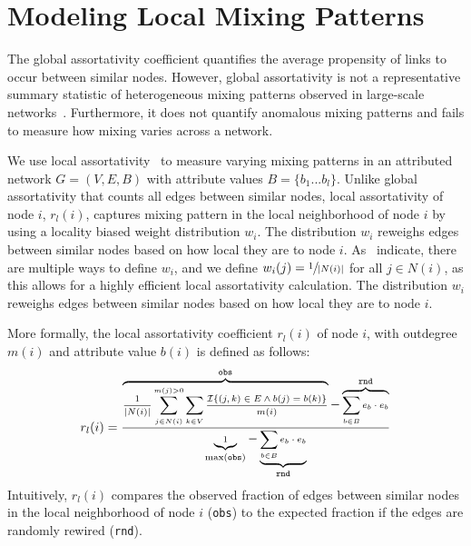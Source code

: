 \section{Modeling Local Mixing Patterns}
\label{subsec:LocalMixing}

The global assortativity coefficient quantifies
the average propensity of links to occur between similar nodes.
However, global assortativity is not a representative summary statistic of
heterogeneous mixing patterns observed in large-scale networks~\cite{peel2018multiscale}.
Furthermore, it does not quantify anomalous mixing patterns and fails to measure how mixing varies across a network.

We use local assortativity~\cite{peel2018multiscale} to measure varying
mixing patterns in an attributed network $G=(V,E,B)$ with attribute values $B=\{b_1...b_l\}$.
Unlike global assortativity that counts all edges between similar nodes, local assortativity
of node $i$, $r_l(i)$, captures mixing pattern in the local neighborhood of node
$i$ by using a locality biased weight distribution $w_i$. The distribution
$w_i$ reweighs edges between similar nodes based on how local they are to
node $i$. As~\citet{peel2018multiscale} indicate, there are multiple ways
to define $w_i$, and we define $w_i(j) = \sfrac{1}{|N(i)|}$ for all $j \in N(i)$, as this allows for a highly efficient local assortativity calculation.
The distribution $w_i$ reweighs edges between similar nodes
based on how local they are to node $i$.

More formally, the local assortativity coefficient $r_l(i)$ of node $i$, with outdegree $m(i)$ and
attribute value $b(i)$ is defined as follows:
\vspace{-1mm}
\begin{align*}
	\scriptsize r_l(i) = \frac{\overbrace{\frac{1}{|N(i)|}\sum\limits_{j \in N(i)}^{m(j) > 0} \sum_{k \in V} \frac{\mathcal{I}\{(j,k) \in E \wedge b(j)=b(k)\}}{m(i)} }^{\texttt{obs}}-\overbrace{\sum_{b \in B} e_{b}\cdot e_{b}}^{\texttt{rnd}}}{\underbrace{1}_{\max(\texttt{obs})}-\underbrace{\sum_{b \in B} e_{b} \cdot e_{b}}_\texttt{rnd}}
\end{align*}
Intuitively, $r_l(i)$ compares the observed fraction of edges between similar nodes
in the local neighborhood of node $i$ (\texttt{obs}) to the expected fraction
if the edges are randomly rewired (\texttt{rnd}).

